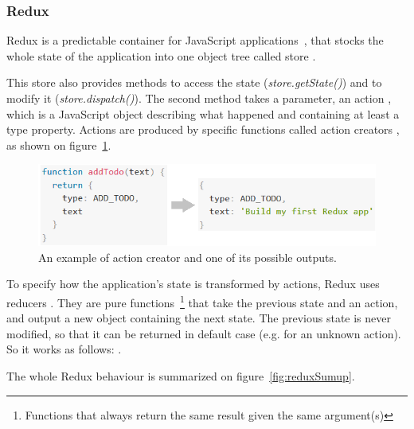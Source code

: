 \subsubsection{Redux}
\label{sssec:redux}

Redux is a predictable container for JavaScript applications~\cite{reduxDoc}, that stocks the whole state of the application into one object tree called \guillemotleft{} store \guillemotright{}. 

This store also provides methods to access the state (\textit{store.getState()}) and to modify it (\textit{store.dispatch()}). The second method takes a parameter, an \guillemotleft{} action \guillemotright{}, which is a JavaScript object describing what happened and containing at least a type property. Actions are produced by specific functions called \guillemotleft{} action 
creators \guillemotright{}, as shown on {\sc figure}~\ref{fig:action}.

\begin{figure}[H]
    \centering
    \includegraphics[scale=0.9]{figure/action.png}
    \caption{An example of action creator and one of its possible outputs.}
    \label{fig:action}
\end{figure}

To specify how the application's state is transformed by actions, Redux uses \guillemotleft{} reducers \guillemotright{}. They are pure functions~\footnote{Functions that always return the same result given the same argument(s)} that take the previous state and an action, and output a new object containing the next state. The previous state is never modified, so that it can be returned in default case (e.g. for an unknown action). So it works as follows: .

The whole Redux behaviour is summarized on {\sc figure}~\ref{fig:reduxSumup}.

